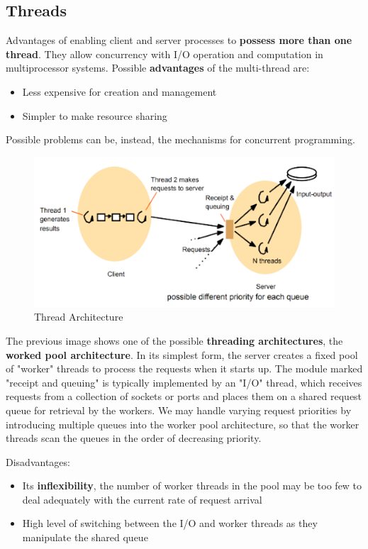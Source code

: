 \subsection{Threads}
Advantages of enabling client and server processes to \textbf{possess more than one thread}.  They allow concurrency with I/O operation and computation in multiprocessor systems. Possible \textbf{advantages} of the multi-thread are:
\begin{itemize}
    \item Less expensive for creation and management
    \item Simpler to make resource sharing
\end{itemize}
Possible problems can be, instead, the mechanisms for concurrent programming.

\begin{figure}[!h]
    \centering
    \includegraphics[width=.7\linewidth]{images/OperatingSystemSupport/threads.png}
    \caption{Thread Architecture}
\end{figure}

The previous image shows one of the possible \textbf{threading architectures}, the \textbf{worked pool architecture}. In its simplest form, the server creates a fixed pool of "worker" threads to process the requests when it starts up. The module marked "receipt and queuing" is typically implemented by an "I/O" thread, which receives requests from a collection of sockets or ports and places them on a shared request queue for retrieval by the workers. We may handle varying request priorities by introducing multiple queues into the worker pool architecture, so that the worker threads scan the queues in the order of decreasing priority.

Disadvantages:
\begin{itemize}
    \item Its \textbf{inflexibility}, the number of worker threads in the pool may be too few to deal adequately with the current rate of request arrival
    \item High level of switching between the I/O and worker threads as they manipulate the shared queue
\end{itemize}

